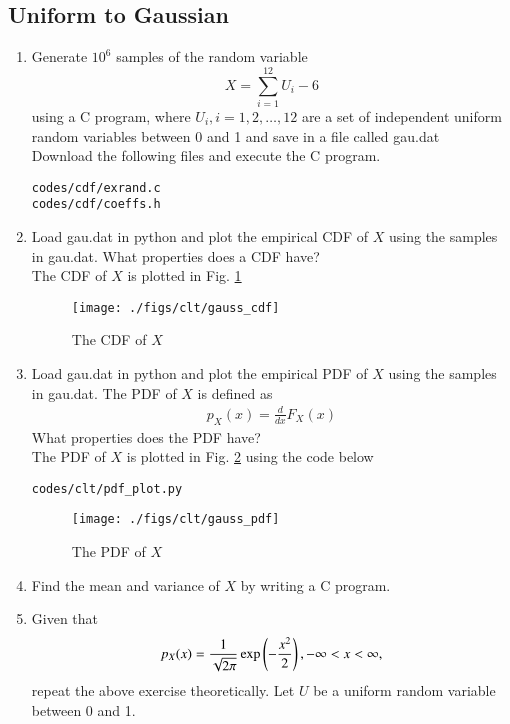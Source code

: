\subsection{Uniform to Gaussian}
\begin{enumerate}[label=\thesubsection.\arabic*
,ref=\thesection.\theenumi]

\item
Generate $10^6$ samples of the random variable
%
\begin{equation}
X = \sum_{i=1}^{12}U_i -6
\end{equation}
%
using a C program, where $U_i, i = 1,2,\dots, 12$ are  a set of independent uniform random variables between 0 and 1
and save in a file called gau.dat
\\
\solution Download the following files and execute the  C program.
\begin{lstlisting}
codes/cdf/exrand.c
codes/cdf/coeffs.h
\end{lstlisting}

%
\item
Load gau.dat in python and plot the empirical CDF of $X$ using the samples in gau.dat. What properties does a CDF have?
\\
\solution The CDF of $X$ is plotted in Fig. \ref{fig:gauss_cdf}
\begin{figure}
\centering
\texttt{[image: ./figs/clt/gauss\_cdf]}
\caption{The CDF of $X$}
\label{fig:gauss_cdf}
\end{figure}


\item
Load gau.dat in python and plot the empirical PDF of $X$ using the samples in gau.dat. The PDF of $X$ is defined as
\begin{align}
p_{X}(x) = \frac{d}{dx}F_{X}(x)
\end{align}
What properties does the PDF have?
\\
\solution The PDF of $X$ is plotted in Fig. \ref{fig:gauss_pdf} using the code below
\begin{lstlisting}
codes/clt/pdf_plot.py
\end{lstlisting}

\begin{figure}
\centering
\texttt{[image: ./figs/clt/gauss\_pdf]}
\caption{The PDF of $X$}
\label{fig:gauss_pdf}
\end{figure}

\item Find the mean and variance of $X$ by writing a C program.
\item Given that 
\begin{align}
p_{X}(x) = \frac{1}{\sqrt{2\pi}}\exp\left(-\frac{x^2}{2}\right), -\infty < x < \infty,
\end{align}
repeat the above exercise theoretically.
%
Let $U$ be a uniform random variable between 0 and 1.


\end{enumerate}

